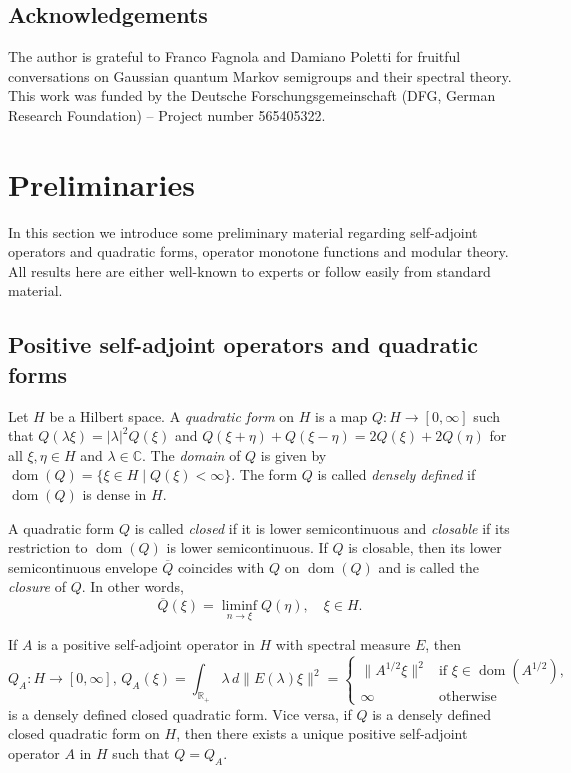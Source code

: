 \documentclass[a4paper,12pt]{amsart}
\newcommand{\abs}[1]{\lvert#1\rvert}
\newcommand{\norm}[1]{\lVert#1\rVert}
\newcommand{\dom}{\operatorname{dom}}
\newcommand{\IC}{\mathbb C}
\newcommand{\IR}{\mathbb R}
\theoremstyle{plain}
\theoremstyle{remark}
\theoremstyle{definition}
\begin{document}
\subsection*{Acknowledgements} The author is grateful to Franco Fagnola and Damiano Poletti for fruitful conversations on Gaussian quantum Markov semigroups and their spectral theory. This work was funded by the Deutsche Forschungsgemeinschaft (DFG, German Research Foundation) -- Project number 565405322.

\section{Preliminaries}\label{sec:prelim}

In this section we introduce some preliminary material regarding self-adjoint operators and quadratic forms, operator monotone functions and modular theory. All results here are either well-known to experts or follow easily from standard material.

\subsection{Positive self-adjoint operators and quadratic forms}

Let $H$ be a Hilbert space. A \emph{quadratic form} on $H$ is a map $Q\colon H\to [0,\infty]$ such that $Q(\lambda\xi)=\abs{\lambda}^2Q(\xi)$ and $Q(\xi+\eta)+Q(\xi-\eta)=2Q(\xi)+2Q(\eta)$ for all $\xi,\eta\in H$ and $\lambda\in \IC$. The \emph{domain} of $Q$ is given by $\dom(Q)=\{\xi\in H\mid Q(\xi)<\infty\}$. The form $Q$ is called \emph{densely defined} if $\dom(Q)$ is dense in $H$.

A quadratic form $Q$ is called \emph{closed} if it is lower semicontinuous and \emph{closable} if its restriction to $\dom(Q)$ is lower semicontinuous. If $Q$ is closable, then its lower semicontinuous envelope $\overline Q$ coincides with $Q$ on $\dom(Q)$ and is called the \emph{closure} of $Q$. In other words,
\begin{equation*}
    \overline Q(\xi)=\liminf_{n\to\xi}Q(\eta),\quad \xi\in H.
\end{equation*}

If $A$ is a positive self-adjoint operator in $H$ with spectral measure $E$, then 
\begin{equation*}
    Q_A\colon H\to [0,\infty],\,Q_A(\xi)=\int_{\IR_+}\lambda \,d\norm{E(\lambda)\xi}^2=\begin{cases}\norm{A^{1/2}\xi}^2&\text{if }\xi\in \dom(A^{1/2}),\\\infty&\text{otherwise}\end{cases}
\end{equation*}
is a densely defined closed quadratic form. Vice versa, if $Q$ is a densely defined closed quadratic form on $H$, then there exists a unique positive self-adjoint operator $A$ in $H$ such that $Q=Q_A$.
\end{document}
